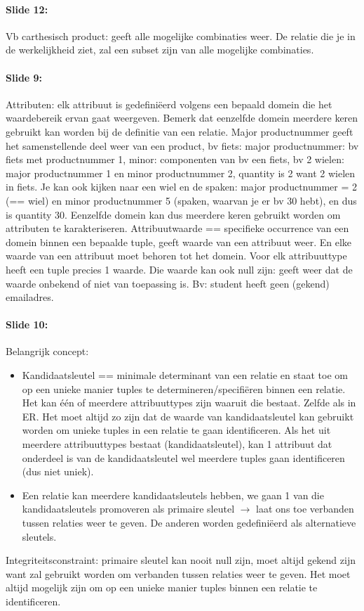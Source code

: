 \documentclass[10pt,a4paper]{report}
\begin{document}
\paragraph{Slide 12:}Vb carthesisch product: geeft alle mogelijke combinaties weer. De relatie die je in de werkelijkheid ziet, zal een subset zijn van alle mogelijke combinaties.

\paragraph{Slide 9:}Attributen: elk attribuut is gedefiniëerd volgens een bepaald domein die het waardebereik ervan gaat weergeven. Bemerk dat eenzelfde domein meerdere keren gebruikt kan worden bij de definitie van een relatie. Major productnummer geeft het samenstellende deel weer van een product, bv fiets:  major productnummer: bv fiets met productnummer 1, minor: componenten van bv een fiets, bv 2 wielen: major productnummer 1 en minor productnummer 2, quantity is 2 want 2 wielen in fiets.
Je kan ook kijken naar een wiel en de spaken: major productnummer = 2 (== wiel) en minor productnummer 5 (spaken, waarvan je er bv 30 hebt), en dus is quantity 30. Eenzelfde domein kan dus meerdere keren gebruikt worden om attributen te karakteriseren. Attribuutwaarde == specifieke occurrence van een domein binnen een bepaalde tuple, geeft waarde van een attribuut weer. En elke waarde van een attribuut moet behoren tot het domein.
Voor elk attribuuttype heeft een tuple precies 1 waarde. Die waarde kan ook null zijn: geeft weer dat de waarde onbekend of niet van toepassing is. Bv: student heeft geen (gekend) emailadres.

\paragraph{Slide 10:}Belangrijk concept: 
\begin{itemize}
\item Kandidaatsleutel == minimale determinant van een relatie en staat toe om op een unieke manier tuples te determineren/specifi\"eren binnen een relatie. Het kan \'e\'en of meerdere attribuuttypes zijn waaruit die bestaat. Zelfde als in ER. Het moet altijd zo zijn dat de waarde van kandidaatsleutel kan gebruikt worden om unieke tuples in een relatie te gaan identificeren. Als het uit meerdere attribuuttypes bestaat (kandidaatsleutel), kan 1 attribuut dat onderdeel is van de kandidaatsleutel wel meerdere tuples gaan identificeren (dus niet uniek). 
\item Een relatie kan meerdere kandidaatsleutels hebben, we gaan 1 van die kandidaatsleutels promoveren als primaire sleutel $\rightarrow$ laat ons toe verbanden tussen relaties weer te geven. De anderen worden gedefiniëerd als alternatieve sleutels.
\end{itemize}
Integriteitsconstraint: primaire sleutel kan nooit null zijn, moet altijd gekend zijn want zal gebruikt worden om verbanden tussen relaties weer te geven. Het moet altijd mogelijk zijn om op een unieke manier tuples binnen een relatie te identificeren.
\end{document}
